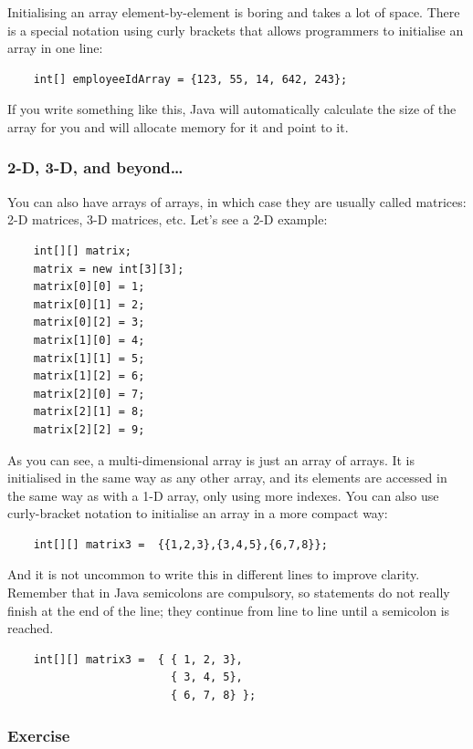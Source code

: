 Initialising an array element-by-element is boring and takes a lot of
space. There is a special notation using curly brackets that allows
programmers to initialise an array in one line: 

\begin{verbatim}
    int[] employeeIdArray = {123, 55, 14, 642, 243};
\end{verbatim}

If you write something like this, Java will automatically calculate
the size of the array for you and will allocate memory for it and
point to it. 

\subsubsection*{2-D, 3-D, and beyond\ldots}
\label{sec:2d-3d-beyondldots}

You can also have arrays of arrays, in which case they are usually
called matrices: 2-D matrices, 3-D matrices, etc. Let's see a 2-D
example: 

\begin{verbatim}
    int[][] matrix;
    matrix = new int[3][3];
    matrix[0][0] = 1;
    matrix[0][1] = 2;
    matrix[0][2] = 3;
    matrix[1][0] = 4;
    matrix[1][1] = 5;
    matrix[1][2] = 6;
    matrix[2][0] = 7;
    matrix[2][1] = 8;
    matrix[2][2] = 9;
\end{verbatim}

As you can see, a multi-dimensional array is just an array of
arrays. It is initialised in the same way as any other array, and its
elements are accessed in the same way as with a 1-D array, only using
more indexes. You can also use curly-bracket notation to initialise an
array in a more compact way: 

\begin{verbatim}
    int[][] matrix3 =  {{1,2,3},{3,4,5},{6,7,8}};
\end{verbatim}

And it is not uncommon to write this in different lines to improve
clarity. Remember that in Java semicolons are compulsory, so
statements do not really finish at the end of the line; they continue
from line to line until a semicolon is reached. 

\begin{verbatim}
    int[][] matrix3 =  { { 1, 2, 3},
                         { 3, 4, 5},
                         { 6, 7, 8} };
\end{verbatim}

\subsubsection{Exercise}
\label{sec:exercisejfjfj}

